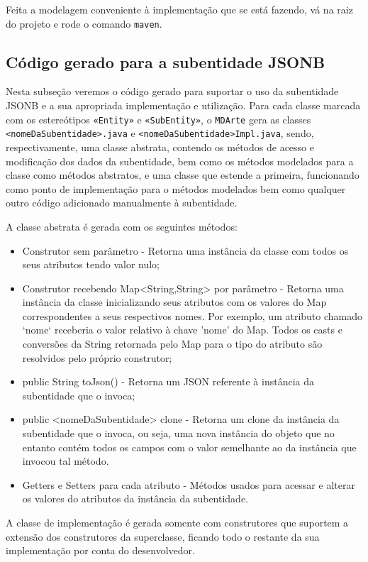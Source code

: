 Feita a modelagem conveniente à implementação que se está fazendo, vá na raiz do
projeto e rode o comando \texttt{maven}.

\subsection{Código gerado para a subentidade JSONB}
Nesta subseção veremos o código gerado para suportar o uso da subentidade JSONB
e a sua apropriada implementação e utilização. Para cada classe marcada com os
estereótipos \texttt{«Entity»} e \texttt{«SubEntity»}, o \texttt{MDArte} gera
as classes \texttt{<nomeDaSubentidade>.java} e
\texttt{<nomeDaSubentidade>Impl.java}, sendo, respectivamente, uma classe
abstrata, contendo os métodos de acesso e modificação dos dados da subentidade,
bem como os métodos modelados para a classe como métodos abstratos, e uma classe
que estende a primeira, funcionando como ponto de implementação para o métodos
modelados bem como qualquer outro código adicionado manualmente à subentidade.

A classe abstrata é gerada com os seguintes métodos:
\begin{itemize}
  \item Construtor sem parâmetro - Retorna uma instância da classe com todos os
  seus atributos tendo valor nulo;
  \item Construtor recebendo Map<String,String> por parâmetro - Retorna uma
  instância da classe inicializando seus atributos com os valores do Map
  correspondentes a seus respectivos nomes. Por exemplo, um atributo chamado
  `nome` receberia o valor relativo à chave 'nome' do Map. Todos os casts e
  conversões da String retornada pelo Map para o tipo do atributo são resolvidos
  pelo próprio construtor;
  \item public String toJson() - Retorna um JSON referente à instância da
  subentidade que o invoca;
  \item public <nomeDaSubentidade> clone - Retorna um clone da instância da
  subentidade que o invoca, ou seja, uma nova instância do objeto que no entanto
  contém todos os campos com o valor semelhante ao da instância que invocou tal
  método.
  \item Getters e Setters para cada atributo - Métodos usados para acessar e
  alterar os valores do atributos da instância da subentidade.
\end{itemize}

A classe de implementação é gerada somente com construtores que suportem a
extensão dos construtores da superclasse, ficando todo o restante da sua
implementação por conta do desenvolvedor.

